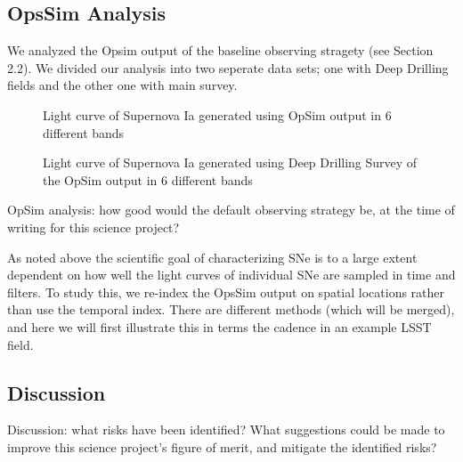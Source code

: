 
\subsection{OpsSim Analysis}
\label{sec:keyword:analysis}

We analyzed the Opsim output of the  baseline observing stragety (see Section 2.2).
We divided our analysis into two seperate data sets; one with Deep Drilling fields and the other one with main survey.

\begin{figure}[tbh!]
\vskip -1.3in
\vskip -1.3in
\caption{ Light curve of Supernova Ia generated using OpSim output in 6 different bands
}
\label{fig:SNIaLCopsimdeep}
\end{figure}



\begin{figure}[tbh!]
\vskip -1.3in
\vskip -1.3in
\caption{ Light curve of Supernova Ia generated using Deep Drilling Survey of the OpSim output in 6 different bands
}
\label{fig:SNIaLCopsimmain}
\end{figure}



OpSim analysis: how good would the default observing strategy be, at
the time of writing for this science project?

As noted above the scientific goal of characterizing SNe is to a large extent
dependent on how well the light curves of individual SNe are sampled in
time and filters. To study this, we re-index the OpsSim output on spatial
locations rather than use the temporal index. There are different methods (which will be merged), and here we will first illustrate this in terms the cadence in an example LSST field.




\subsection{Discussion}
\label{sec:keyword:discussion}

Discussion: what risks have been identified? What suggestions could be
made to improve this science project's figure of merit, and mitigate
the identified risks?


